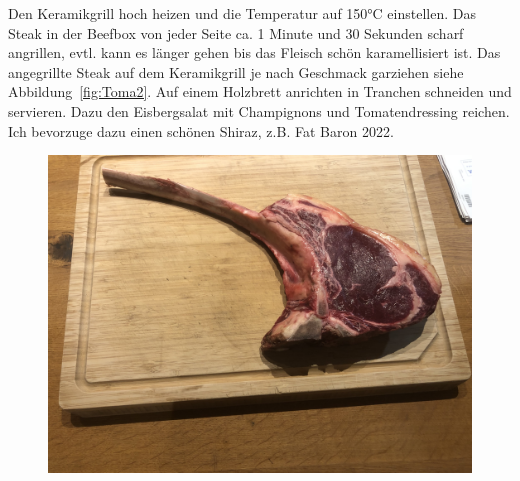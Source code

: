 Den Keramikgrill hoch heizen und die Temperatur auf 150°C einstellen.
Das Steak in der Beefbox von jeder Seite ca. 1 Minute und 30 Sekunden scharf 
angrillen, evtl. kann es länger gehen bis das Fleisch schön karamellisiert ist.
Das angegrillte Steak auf dem Keramikgrill je nach Geschmack garziehen siehe 
Abbildung~\vref{fig:Toma2}. Auf einem Holzbrett anrichten in Tranchen 
schneiden und servieren.
Dazu den Eisbergsalat mit Champignons und Tomatendressing reichen.
Ich bevorzuge dazu einen schönen Shiraz, z.B. Fat Baron 2022.
\newpage
\begin{figure}[htbp]
	\centering
	\begin{minipage}{1\textwidth}
	\centering	
	\includegraphics[width=1\linewidth]{pics/Tomahawk_roh}
	\label{fig:Toma1}
	\end{minipage}
\end{figure}


